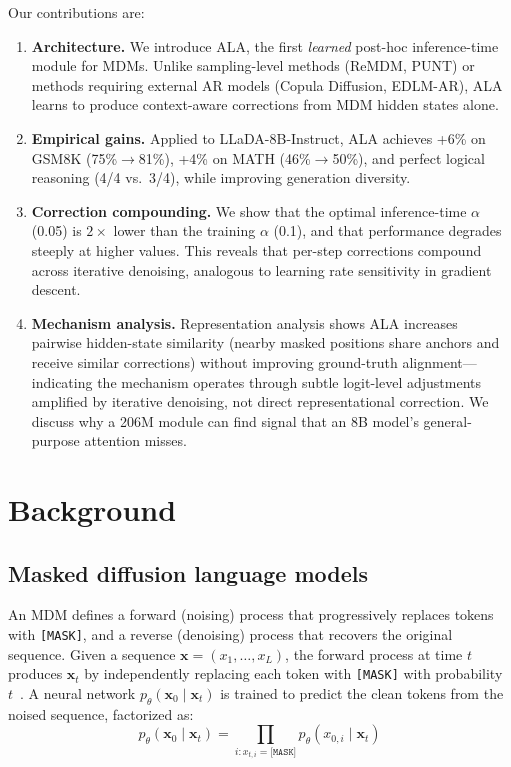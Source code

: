 \documentclass{article} %
\begin{document}
Our contributions are:
\begin{enumerate}
    \item \textbf{Architecture.} We introduce ALA, the first \emph{learned} post-hoc inference-time module for MDMs. Unlike sampling-level methods (ReMDM, PUNT) or methods requiring external AR models (Copula Diffusion, EDLM-AR), ALA learns to produce context-aware corrections from MDM hidden states alone.
    \item \textbf{Empirical gains.} Applied to LLaDA-8B-Instruct, ALA achieves +6\% on GSM8K (75\%$\to$81\%), +4\% on MATH (46\%$\to$50\%), and perfect logical reasoning (4/4 vs.\ 3/4), while improving generation diversity.
    \item \textbf{Correction compounding.} We show that the optimal inference-time $\alpha$ (0.05) is $2\times$ lower than the training $\alpha$ (0.1), and that performance degrades steeply at higher values. This reveals that per-step corrections compound across iterative denoising, analogous to learning rate sensitivity in gradient descent.
    \item \textbf{Mechanism analysis.} Representation analysis shows ALA increases pairwise hidden-state similarity (nearby masked positions share anchors and receive similar corrections) without improving ground-truth alignment---indicating the mechanism operates through subtle logit-level adjustments amplified by iterative denoising, not direct representational correction. We discuss why a 206M module can find signal that an 8B model's general-purpose attention misses.
\end{enumerate}


\section{Background}
\label{sec:background}

\subsection{Masked diffusion language models}

An MDM defines a forward (noising) process that progressively replaces tokens with \texttt{[MASK]}, and a reverse (denoising) process that recovers the original sequence.
Given a sequence $\mathbf{x} = (x_1, \ldots, x_L)$, the forward process at time $t$ produces $\mathbf{x}_t$ by independently replacing each token with \texttt{[MASK]} with probability $t$~\citep{austin2021structured, sahoo2024simple}.
A neural network $p_\theta(\mathbf{x}_0 \mid \mathbf{x}_t)$ is trained to predict the clean tokens from the noised sequence, factorized as:
\begin{equation}
    p_\theta(\mathbf{x}_0 \mid \mathbf{x}_t) = \prod_{i : x_{t,i} = \texttt{[MASK]}} p_\theta(x_{0,i} \mid \mathbf{x}_t)
    \label{eq:ci}
\end{equation}
\end{document}
